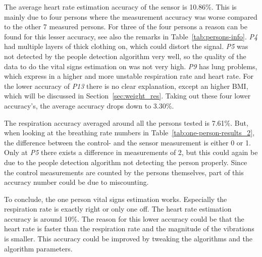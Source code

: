 The average heart rate estimation accuracy of the sensor is 10.86\%. This is mainly due to four persons where the measurement accuracy was worse compared to the other 7 measured persons. For three of the four persons a reason can be found for this lesser accuracy, see also the remarks in Table~\ref{tab:persons-info}. \emph{P4} had multiple layers of thick clothing on, which could distort the signal. \emph{P5} was not detected by the people detection algorithm very well, so the quality of the data to do the vital signs estimation on was not very high. \emph{P9} has lung problems, which express in a higher and more unstable respiration rate and heart rate. For the lower accuracy of \emph{P13} there is no clear explanation, except an higher BMI, which will be discussed in Section~\ref{sec:weight_res}. Taking out these four lower accuracy's, the average accuracy drops down to 3.30\%.

The respiration accuracy averaged around all the persons tested is 7.61\%. But, when looking at the breathing rate numbers in Table~\ref{tab:one-person-results_2}, the difference between the control- and the sensor measurement is either 0 or 1. Only at \emph{P5} there exists a difference in measurements of 2, but this could again be due to the people detection algorithm not detecting the person properly. Since the control measurements are counted by the persons themselves, part of this accuracy number could be due to miscounting.

To conclude, the one person vital signs estimation works. Especially the respiration rate is exactly right or only one off. The heart rate estimation accuracy is around 10\%. The reason for this lower accuracy could be that the heart rate is faster than the respiration rate and the magnitude of the vibrations is smaller. This accuracy could be improved by tweaking the algorithms and the algorithm parameters.

